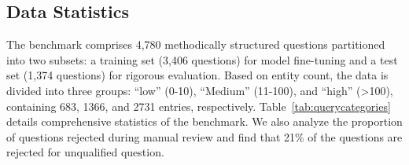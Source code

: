 \subsection{Data Statistics}
The benchmark comprises 4,780 methodically structured questions partitioned into two subsets: a training set (3,406 questions) for model fine-tuning and a test set (1,374 questions) for rigorous evaluation. Based on entity count, the data is divided into three groups: ``low'' (0-10), ``Medium'' (11-100), and ``high'' (>100), containing 683, 1366, and 2731 entries, respectively. Table~\ref{tab:querycategories} details comprehensive statistics of the benchmark. We also analyze the proportion of questions rejected during manual review and find that 21\% of the questions are rejected for unqualified question.



